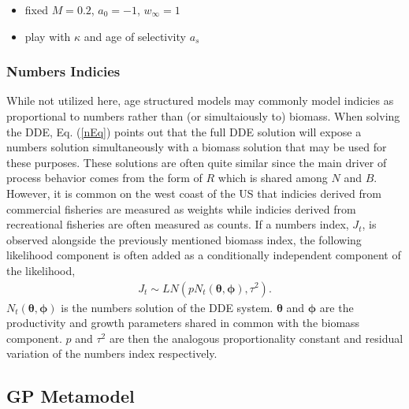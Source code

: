 \begin{itemize}
\item fixed $M=0.2$, $a_0=-1$, $w_\infty=1$
\item play with $\kappa$ and age of selectivity $a_s$
\end{itemize}

%
\subsubsection{Numbers Indicies}

%
While not utilized here, age structured models may commonly model 
indicies as proportional to numbers rather than (or simultaiously to) 
biomass. When solving the DDE, Eq. (\ref{nEq}) points out that the full DDE 
solution will expose a numbers solution simultaneously with a biomass solution 
that may be used for these purposes. These solutions are often quite similar 
since the main driver of process behavior comes from the form of $R$ which is 
shared among $N$ and $B$. 
However, it is common on the west coast of the US that indicies derived from commercial 
fisheries are measured as weights %
while indicies derived from recreational fisheries are often measured as counts.
If a numbers index, $J_t$, is observed alongside the previously 
mentioned biomass index, the following likelihood component is often added as a 
conditionally independent component of the likelihood, %
\begin{align}
J_t \sim LN(p N_t(\bm{\theta}, \bm{\phi}), \tau^{2}) \label{nL}.
\end{align}
%
$N_t(\bm{\theta}, \bm{\phi})$ is the numbers solution of the DDE system.
$\bm{\theta}$ and $\bm{\phi}$ are the productivity and growth parameters shared in 
common with the biomass component. $p$ and $\tau^2$ are then the analogous 
proportionality constant and residual variation of the numbers index respectively.

%
\subsection{GP Metamodel}

